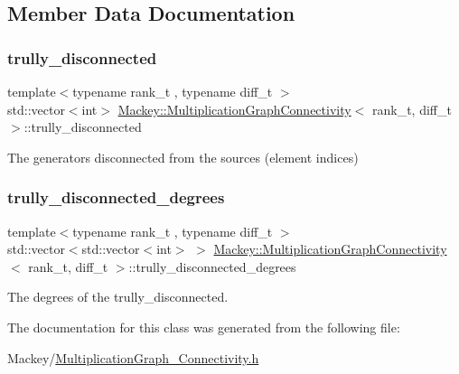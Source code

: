 \subsection{Member Data Documentation}
\mbox{\label{classMackey_1_1MultiplicationGraphConnectivity_a4f13de641c34260697b086a9e0a559e9}} 
\subsubsection{\texorpdfstring{trully\+\_\+disconnected}{trully\_disconnected}}
{\footnotesize\ttfamily template$<$typename rank\+\_\+t , typename diff\+\_\+t $>$ \\
std\+::vector$<$int$>$ \hyperlink{classMackey_1_1MultiplicationGraphConnectivity}{Mackey\+::\+Multiplication\+Graph\+Connectivity}$<$ rank\+\_\+t, diff\+\_\+t $>$\+::trully\+\_\+disconnected}



The generators disconnected from the sources (element indices) 

\mbox{\label{classMackey_1_1MultiplicationGraphConnectivity_aeb3b83b6505dcaf1ec2759259ba66e5c}} 
\subsubsection{\texorpdfstring{trully\+\_\+disconnected\+\_\+degrees}{trully\_disconnected\_degrees}}
{\footnotesize\ttfamily template$<$typename rank\+\_\+t , typename diff\+\_\+t $>$ \\
std\+::vector$<$std\+::vector$<$int$>$ $>$ \hyperlink{classMackey_1_1MultiplicationGraphConnectivity}{Mackey\+::\+Multiplication\+Graph\+Connectivity}$<$ rank\+\_\+t, diff\+\_\+t $>$\+::trully\+\_\+disconnected\+\_\+degrees}



The degrees of the trully\+\_\+disconnected. 



The documentation for this class was generated from the following file\+:\begin{DoxyCompactItemize}
\item 
Mackey/\hyperlink{MultiplicationGraph__Connectivity_8h}{Multiplication\+Graph\+\_\+\+Connectivity.\+h}\end{DoxyCompactItemize}
